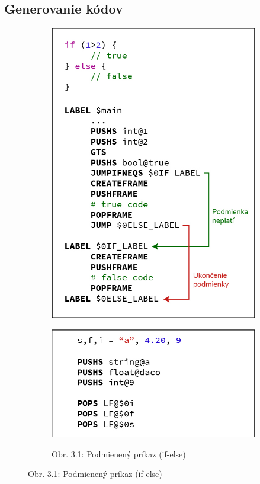 \documentclass[a4paper,11pt]{article}
\begin{document}
		\subsection{Generovanie kódov}\label{subsec:genkod}
			\begin{figure}[h!]
				\centering
				\begin{subfigure}[h]{0.4\textwidth}
	    			\centering
	    			\includegraphics[width=\textwidth]{codes/if.jpg}\\
					\caption*{Obr. 3.1: Podmienený príkaz (if-else)}
					\label{fig:if}
					\vspace{2cm}
					\includegraphics[width=\textwidth]{codes/multi_var.jpg}\\

\end{subfigure}
\end{figure}
\end{document}
